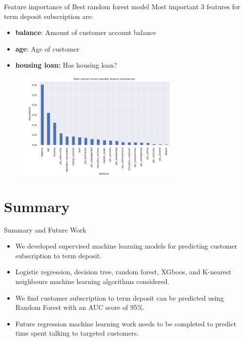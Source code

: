 \begin{frame}{Feature importance of Best random forest model}
Most important 3 features for term deposit subscription are:
\begin{itemize}
  \item \textbf{balance}: Amount of customer account balance
    \item \textbf{age}: Age of customer
    \item \textbf{housing loan:} Has housing loan?
\end{itemize}
\begin{figure}
		\includegraphics[width=8.0cm]{figures/fig_feature_importance_rf.PNG}
	\end{figure}
\end{frame}




\section{Summary} %


\begin{frame}{Summary and Future Work}
\linespread{1.3}

\begin{itemize}
    \item We developed supervised machine learning models for predicting customer subscription to term deposit.
    \item Logistic regression, decision tree, random forest, XGboos, and K-nearest neighbours machine learning algorithms considered. 
    \item We find customer subscription to term deposit can be predicted using Random Forest with an AUC score of 95\%.
    \item Future regression machine learning work needs to be completed to predict time spent talking to targeted customers.
    
\end{itemize}


\end{frame}


